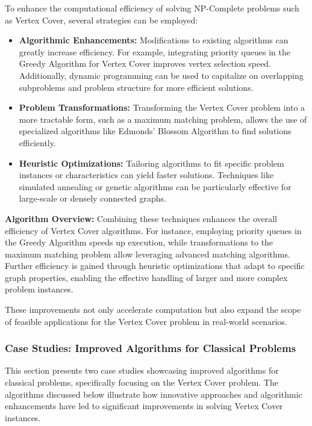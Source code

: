 To enhance the computational efficiency of solving NP-Complete problems such as Vertex Cover, several strategies can be employed:

\begin{itemize}
    \item \textbf{Algorithmic Enhancements:} Modifications to existing algorithms can greatly increase efficiency. For example, integrating priority queues in the Greedy Algorithm for Vertex Cover improves vertex selection speed. Additionally, dynamic programming can be used to capitalize on overlapping subproblems and problem structure for more efficient solutions.
    
    \item \textbf{Problem Transformations:} Transforming the Vertex Cover problem into a more tractable form, such as a maximum matching problem, allows the use of specialized algorithms like Edmonds' Blossom Algorithm to find solutions efficiently.
    
    \item \textbf{Heuristic Optimizations:} Tailoring algorithms to fit specific problem instances or characteristics can yield faster solutions. Techniques like simulated annealing or genetic algorithms can be particularly effective for large-scale or densely connected graphs.
\end{itemize}

\textbf{Algorithm Overview:}
Combining these techniques enhances the overall efficiency of Vertex Cover algorithms. For instance, employing priority queues in the Greedy Algorithm speeds up execution, while transformations to the maximum matching problem allow leveraging advanced matching algorithms. Further efficiency is gained through heuristic optimizations that adapt to specific graph properties, enabling the effective handling of larger and more complex problem instances.

These improvements not only accelerate computation but also expand the scope of feasible applications for the Vertex Cover problem in real-world scenarios.

\subsubsection{Case Studies: Improved Algorithms for Classical Problems}

This section presents two case studies showcasing improved algorithms for classical problems, specifically focusing on the Vertex Cover problem. The algorithms discussed below illustrate how innovative approaches and algorithmic enhancements have led to significant improvements in solving Vertex Cover instances.

